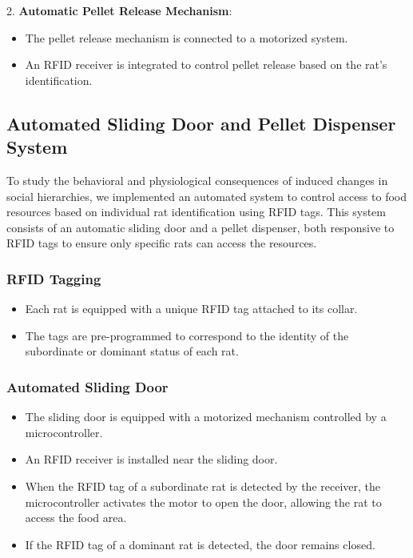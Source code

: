 \documentclass[english, a4paper, 11pt]{article}
\begin{document}
2. \textbf{Automatic Pellet Release Mechanism}:
\begin{itemize}
    \item The pellet release mechanism is connected to a motorized system.
    \item An RFID receiver is integrated to control pellet release based on the rat's identification.
\end{itemize}

\subsection*{Automated Sliding Door and Pellet Dispenser System}

To study the behavioral and physiological consequences of induced changes in social hierarchies, we implemented an automated system to control access to food resources based on individual rat identification using RFID tags. This system consists of an automatic sliding door and a pellet dispenser, both responsive to RFID tags to ensure only specific rats can access the resources.

\subsubsection*{RFID Tagging}
\begin{itemize}
    \item Each rat is equipped with a unique RFID tag attached to its collar.
    \item The tags are pre-programmed to correspond to the identity of the subordinate or dominant status of each rat.
\end{itemize}

\subsubsection*{Automated Sliding Door}
\begin{itemize}
    \item The sliding door is equipped with a motorized mechanism controlled by a microcontroller.
    \item An RFID receiver is installed near the sliding door.
    \item When the RFID tag of a subordinate rat is detected by the receiver, the microcontroller activates the motor to open the door, allowing the rat to access the food area.
    \item If the RFID tag of a dominant rat is detected, the door remains closed.
\end{itemize}
\end{document}
